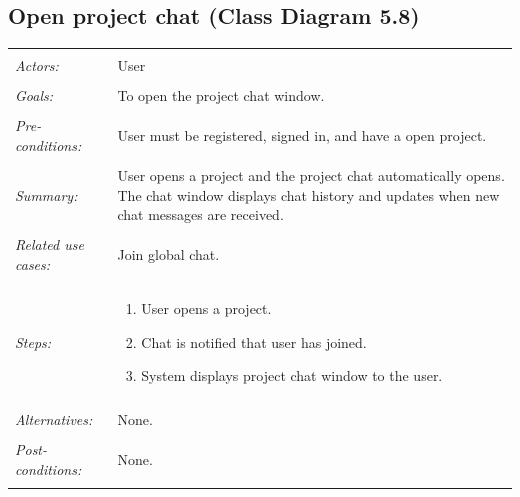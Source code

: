\documentclass[11pt]{report}
\begin{document}
\subsection{Open project chat (Class Diagram 5.8)}
\begin{tabular}{ p{2cm} p{12cm} }
 \hline
 \\
 \textit{Actors:} & User \\ 
 \\
 \textit{Goals:} & To open the project chat window. \\
 \\
 \textit{Pre-conditions:} & User must be registered, signed in, and have a open project.  \\
 \\
 \textit{Summary:} & User opens a project and the project chat automatically opens. The chat window displays chat history and updates when new chat messages are received. \\ 
 \\
 \textit{Related use cases:} & Join global chat. \\ 
 \\
 \textit{Steps:} & \begin{enumerate}
  \item User opens a project.
  \item Chat is notified that user has joined.
  \item System displays project chat window to the user.
 \end{enumerate} \\
 \\
 \textit{Alternatives:} & None. \\
 \\
 \textit{Post-conditions:} & None. \\
 \\
\hline
\end{tabular}
\end{document}
